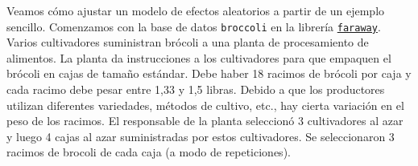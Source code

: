 \documentclass[
]{book}
\newenvironment{Shaded}{\begin{snugshade}}{\end{snugshade}}
\newcommand{\CommentTok}[1]{\textcolor[rgb]{0.56,0.35,0.01}{\textit{#1}}}
\newcommand{\FunctionTok}[1]{\textcolor[rgb]{0.00,0.00,0.00}{#1}}
\newcommand{\NormalTok}[1]{#1}
\newcommand{\SpecialCharTok}[1]{\textcolor[rgb]{0.00,0.00,0.00}{#1}}
\begin{document}
\begin{Shaded}
\end{Shaded}

Veamos cómo ajustar un modelo de efectos aleatorios a partir de un ejemplo sencillo. Comenzamos con la base de datos \texttt{broccoli} en la librería \href{https://cran.r-project.org/web/packages/faraway/faraway.pdf}{\texttt{faraway}}. Varios cultivadores suministran brócoli a una planta de procesamiento de alimentos. La planta da instrucciones a los cultivadores para que empaquen el brócoli en cajas de tamaño estándar. Debe haber 18 racimos de brócoli por caja y cada racimo debe pesar entre 1,33 y 1,5 libras. Debido a que los productores utilizan diferentes variedades, métodos de cultivo, etc., hay cierta variación en el peso de los racimos. El responsable de la planta seleccionó 3 cultivadores al azar y luego 4 cajas al azar suministradas por estos cultivadores. Se seleccionaron 3 racimos de brocoli de cada caja (a modo de repeticiones).
\end{document}
